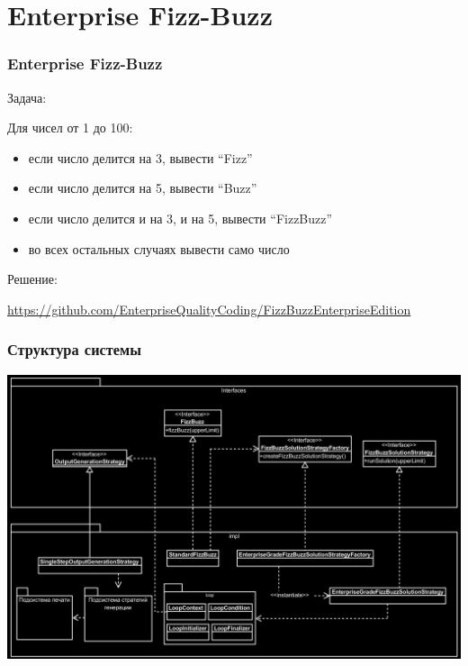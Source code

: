 \documentclass{../cscslides}
\begin{document}
    
    \frame{\titlepage}

    \section{Enterprise Fizz-Buzz}

    \begin{frame}
        \frametitle{Enterprise Fizz-Buzz}
        Задача:

        Для чисел от 1 до 100:
        \begin{itemize}
            \item если число делится на 3, вывести ``Fizz''
            \item если число делится на 5, вывести ``Buzz''
            \item если число делится и на 3, и на 5, вывести ``FizzBuzz''
            \item во всех остальных случаях вывести само число
        \end{itemize}

        Решение:

        \begin{footnotesize}
            \url{https://github.com/EnterpriseQualityCoding/FizzBuzzEnterpriseEdition}
        \end{footnotesize}
    \end{frame}

    \begin{frame}
        \frametitle{Структура системы}
        \begin{center}
            \includegraphics[width=\textwidth]{fizzBuzzArchitectureBlack.png}
        \end{center}
    \end{frame}
\end{document}
